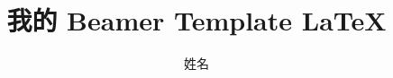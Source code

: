 
\title{我的 Beamer Template \LaTeX}
%
%
\author{姓名}
%
%
%
%
\date{}
%
%
%
%

%
%


\usepackage{geometry}
\usepackage{fancyhdr}
\usepackage{ctex}
\usepackage{graphicx}
\usepackage{subfigure}
\usepackage[english]{babel}
\usepackage{mathptmx}
\usepackage{amsthm}
\usepackage[T1]{fontenc}
\usepackage{float}
\usepackage[ruled,linesnumbered]{algorithm2e}

\graphicspath{{figures/}}